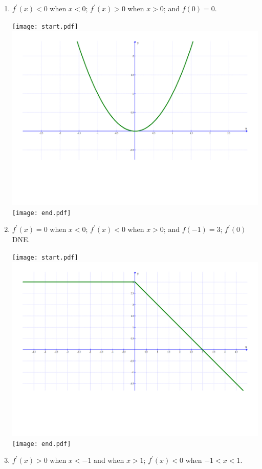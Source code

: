 \documentclass[12pt]{article}
\begin{document}
\begin{enumerate}
\begin{enumerate}
\item $f^{\prime}(x) <0$ when $x<0$; $f^{\prime}(x) >0$ when $x>0$; and $f(0) = 0$.

\texttt{[image: start.pdf]}
{{\includegraphics[scale=0.35]{graph1.pdf}}}
\texttt{[image: end.pdf]}


\item $f^{\prime}(x) = 0$ when $x<0$; $f^{\prime}(x) <0$ when $x>0$; and $f(-1) = 3$; $f^{\prime}(0)$ DNE.

\texttt{[image: start.pdf]}
{{\includegraphics[scale=0.35]{graph2.pdf}}}
\texttt{[image: end.pdf]}


\item $f^{\prime}(x) >0$ when $x<-1$ and when $x>1$; $f^{\prime}(x) < 0$ when $-1<x<1$.  


\end{enumerate}
\end{enumerate}
\end{document}
